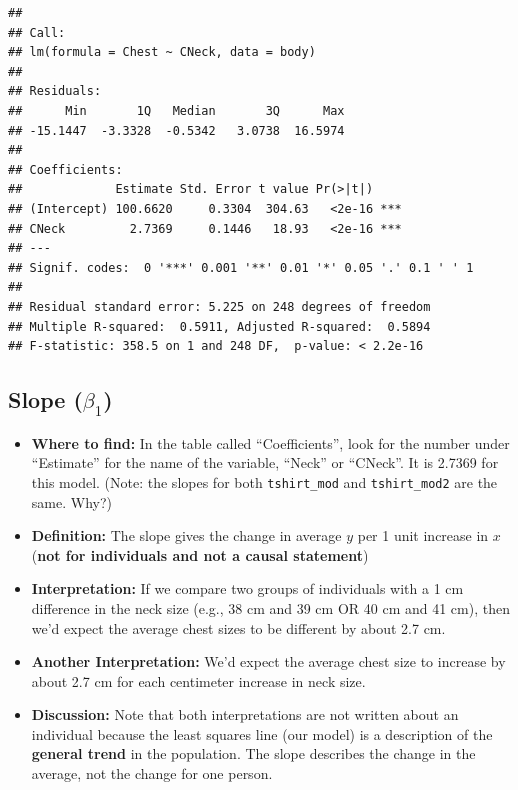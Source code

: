 \documentclass[]{book}
\newenvironment{Shaded}{\begin{snugshade}}{\end{snugshade}}
\newcommand{\DataTypeTok}[1]{\textcolor[rgb]{0.13,0.29,0.53}{#1}}
\newcommand{\KeywordTok}[1]{\textcolor[rgb]{0.13,0.29,0.53}{\textbf{#1}}}
\newcommand{\NormalTok}[1]{#1}
\newcommand{\OperatorTok}[1]{\textcolor[rgb]{0.81,0.36,0.00}{\textbf{#1}}}
\newcommand{\StringTok}[1]{\textcolor[rgb]{0.31,0.60,0.02}{#1}}
\providecommand{\tightlist}{%
  \setlength{\itemsep}{0pt}\setlength{\parskip}{0pt}}
\begin{document}
\begin{Shaded}
\end{Shaded}

\begin{verbatim}
## 
## Call:
## lm(formula = Chest ~ CNeck, data = body)
## 
## Residuals:
##      Min       1Q   Median       3Q      Max 
## -15.1447  -3.3328  -0.5342   3.0738  16.5974 
## 
## Coefficients:
##             Estimate Std. Error t value Pr(>|t|)    
## (Intercept) 100.6620     0.3304  304.63   <2e-16 ***
## CNeck         2.7369     0.1446   18.93   <2e-16 ***
## ---
## Signif. codes:  0 '***' 0.001 '**' 0.01 '*' 0.05 '.' 0.1 ' ' 1
## 
## Residual standard error: 5.225 on 248 degrees of freedom
## Multiple R-squared:  0.5911, Adjusted R-squared:  0.5894 
## F-statistic: 358.5 on 1 and 248 DF,  p-value: < 2.2e-16
\end{verbatim}

\hypertarget{slope-beta_1}{%
\subsection{\texorpdfstring{Slope (\(\beta_1\))}{Slope (\textbackslash{}beta\_1)}}\label{slope-beta_1}}

\begin{itemize}
\tightlist
\item
  \textbf{Where to find:} In the table called ``Coefficients'', look for the number under ``Estimate'' for the name of the variable, ``Neck'' or ``CNeck''. It is 2.7369 for this model. (Note: the slopes for both \texttt{tshirt\_mod} and \texttt{tshirt\_mod2} are the same. Why?)
\item
  \textbf{Definition:} The slope gives the change in average \(y\) per 1 unit increase in \(x\) (\textbf{not for individuals and not a causal statement})
\item
  \textbf{Interpretation:} If we compare two groups of individuals with a 1 cm difference in the neck size (e.g., 38 cm and 39 cm OR 40 cm and 41 cm), then we'd expect the average chest sizes to be different by about 2.7 cm.
\item
  \textbf{Another Interpretation:} We'd expect the average chest size to increase by about 2.7 cm for each centimeter increase in neck size.
\item
  \textbf{Discussion:} Note that both interpretations are not written about an individual because the least squares line (our model) is a description of the \textbf{general trend} in the population. The slope describes the change in the average, not the change for one person.
\end{itemize}
\end{document}

